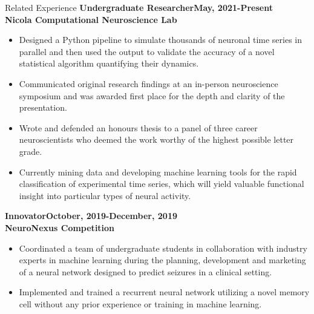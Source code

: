 \documentclass[12pt]{resume}
\begin{document}
\begin{rSection}{\Large Related Experience}
    {\bf Undergraduate Researcher\hfill {May, 2021-Present}}\\
    {\bf Nicola Computational Neuroscience Lab}
    \begin{itemize}
        \setlength\itemsep{-0.5em}
        \item Designed a Python pipeline to simulate thousands of neuronal time series in parallel and then used the 
        output to validate the accuracy of a novel statistical algorithm quantifying their dynamics.
        \item Communicated original research findings at an in-person neuroscience symposium and was awarded
        first place for the depth and clarity of the presentation.
        \item Wrote and defended an honours thesis to a panel of three career neuroscientists who deemed the work 
        worthy of the highest possible letter grade. 
        \item Currently mining data and developing machine learning tools for the rapid classification of experimental
        time series, which will yield valuable functional insight into particular types of neural activity. 
    \end{itemize}
    {\bf Innovator\hfill {October, 2019-December, 2019}}\\
    {\bf NeuroNexus Competition}
    \begin{itemize}
        \setlength\itemsep{-0.5em}
        \item Coordinated a team of undergraduate students in collaboration with industry experts in machine 
        learning during the planning, development and marketing of a neural network designed to predict 
        seizures in a clinical setting.
        \item Implemented and trained a recurrent neural network utilizing a novel memory cell without any 
        prior experience or training in machine learning. 
    \end{itemize}
\end{rSection}
\end{document}
